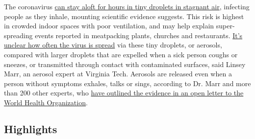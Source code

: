 The coronavirus
\href{https://www.nytimes3xbfgragh.onion/2020/07/04/health/239-experts-with-one-big-claim-the-coronavirus-is-airborne.html}{can
stay aloft for hours in tiny droplets in stagnant air}, infecting people
as they inhale, mounting scientific evidence suggests. This risk is
highest in crowded indoor spaces with poor ventilation, and may help
explain super-spreading events reported in meatpacking plants, churches
and restaurants.
\href{https://www.nytimes3xbfgragh.onion/2020/07/06/health/coronavirus-airborne-aerosols.html}{It's
unclear how often the virus is spread} via these tiny droplets, or
aerosols, compared with larger droplets that are expelled when a sick
person coughs or sneezes, or transmitted through contact with
contaminated surfaces, said Linsey Marr, an aerosol expert at Virginia
Tech. Aerosols are released even when a person without symptoms exhales,
talks or sings, according to Dr. Marr and more than 200 other experts,
who
\href{https://academic.oup.com/cid/article/doi/10.1093/cid/ciaa939/5867798}{have
outlined the evidence in an open letter to the World Health
Organization}.

\hypertarget{highlights}{%
\subsection{Highlights}\label{highlights}}

